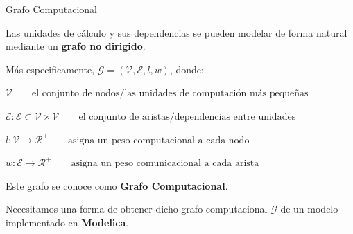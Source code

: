 \begin{frame}{Grafo Computacional}


Las unidades de cálculo y sus dependencias se pueden modelar de forma natural
mediante un \textbf{grafo no dirigido}.

Más especificamente, $\mathcal{G} = (\mathcal{V}, \mathcal{E}, l, 
w)$, donde:

\vspace{1em}

$\mathcal{V} \hspace{2em} \text{el conjunto de nodos/las unidades de computación más pequeñas}$

$\mathcal{E}: \mathcal{E} \subset \mathcal{V} \times \mathcal{V} 
\hspace{2em} \text{el conjunto de aristas/dependencias entre unidades}$

$l: \mathcal{V} \to \mathcal{R}^+ \hspace{2em} 
\text{asigna un peso computacional a cada nodo}$

$w: \mathcal{E} \to \mathcal{R}^+ \hspace{2em} 
\text{asigna un peso comunicacional a cada arista} $

\vspace {1em}

Este grafo se conoce como \textbf{Grafo Computacional}.

\pause

\vspace {1em}

Necesitamos una forma de obtener dicho grafo computacional $\mathcal{G}$
de un modelo implementado en \textbf{Modelica}.

\end{frame}


